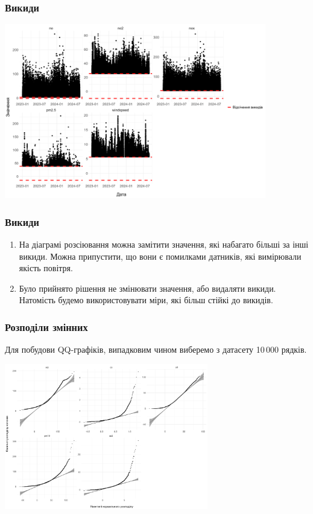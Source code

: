\documentclass{beamer}
\begin{document}
\begin{frame}
  \frametitle{Викиди}

  \begin{center}
    \includegraphics[height=3in]{plots/outliers/scatter-p2.png}
  \end{center}
\end{frame}

\begin{frame}
  \frametitle{Викиди}

  \begin{enumerate}
    \item На діаграмі розсіювання можна замітити значення, які набагато більші за
    інші викиди. Можна припустити, що вони є помилками датників, які вимірювали якість
    повітря.
    \item  Було прийнято рішення не змінювати значення, або видаляти викиди.
    Натомість будемо використовувати міри, які більш стійкі до викидів.
  \end{enumerate}
\end{frame}

\begin{frame}
  \frametitle{Розподіли змінних}

  Для побудови QQ-графіків, випадковим чином виберемо з датасету 10\,000 рядків.

  \begin{center}
    \includegraphics[height=2.5in]{plots/qq_tidy/qq-p1.png}
  \end{center}
\end{frame}
\end{document}
